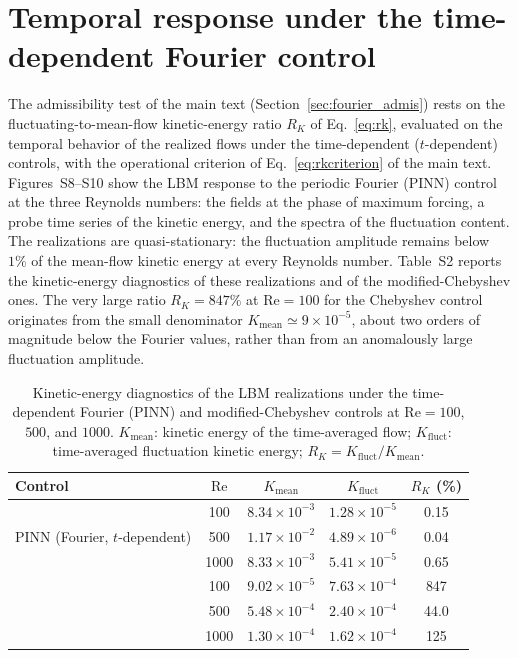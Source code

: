 \documentclass[11pt]{article}
\newcommand{\re}{\mathrm{Re}}
\begin{document}
\section{Temporal response under the time-dependent Fourier control}

The admissibility test of the main text (Section~\ref{sec:fourier_admis}) rests on the fluctuating-to-mean-flow kinetic-energy ratio $R_K$ of Eq.~\eqref{eq:rk}, evaluated on the temporal behavior of the realized flows under the time-dependent ($t$-dependent) controls, with the operational criterion of Eq.~\eqref{eq:rkcriterion} of the main text. Figures~S8--S10 show the LBM response to the periodic Fourier (PINN) control at the three Reynolds numbers: the fields at the phase of maximum forcing, a probe time series of the kinetic energy, and the spectra of the fluctuation content. The realizations are quasi-stationary: the fluctuation amplitude remains below $1\%$ of the mean-flow kinetic energy at every Reynolds number. Table~S2 reports the kinetic-energy diagnostics of these realizations and of the modified-Chebyshev ones. The very large ratio $R_K=847\%$ at $\re=100$ for the Chebyshev control originates from the small denominator $K_{\mathrm{mean}}\simeq9\times10^{-5}$, about two orders of magnitude below the Fourier values, rather than from an anomalously large fluctuation amplitude.

\begin{table}[ht]
\centering
\caption{Kinetic-energy diagnostics of the LBM realizations under the time-dependent Fourier (PINN) and modified-Chebyshev controls at $\re=100$, $500$, and $1000$. $K_{\mathrm{mean}}$: kinetic energy of the time-averaged flow; $K_{\mathrm{fluct}}$: time-averaged fluctuation kinetic energy; $R_K=K_{\mathrm{fluct}}/K_{\mathrm{mean}}$.}
\label{tab:s2}
\begin{tabular}{lcccc}
\toprule
Control & $\re$ & $K_{\mathrm{mean}}$ & $K_{\mathrm{fluct}}$ & $R_K$ (\%) \\
\midrule
\multirow{3}{*}{PINN (Fourier, $t$-dependent)}
 & 100  & $8.34\times10^{-3}$ & $1.28\times10^{-5}$ & 0.15 \\
 & 500  & $1.17\times10^{-2}$ & $4.89\times10^{-6}$ & 0.04 \\
 & 1000 & $8.33\times10^{-3}$ & $5.41\times10^{-5}$ & 0.65 \\
\addlinespace
\multirow{3}{*}{Chebyshev ($t$-dependent)}
 & 100  & $9.02\times10^{-5}$ & $7.63\times10^{-4}$ & 847 \\
 & 500  & $5.48\times10^{-4}$ & $2.40\times10^{-4}$ & 44.0 \\
 & 1000 & $1.30\times10^{-4}$ & $1.62\times10^{-4}$ & 125 \\
\bottomrule
\end{tabular}
\end{table}
\end{document}
